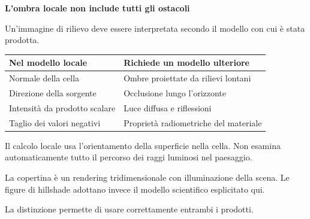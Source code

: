 \documentclass[12pt,aspectratio=1610]{beamer}
\newcommand{\PBody}[1]{\par{\fontsize{11.3}{14.8}\selectfont #1\par}}
\newcommand{\PSmall}[1]{\par{\fontsize{9.8}{13.1}\selectfont #1\par}}
\newcommand{\PInfo}[1]{%
\begin{tcolorbox}[enhanced,arc=1.6mm,boxrule=.55pt,colback=GeoTint,
 colframe=Rule!80!Classical,left=2.3mm,right=2.3mm,top=2mm,bottom=2mm,
 before skip=1mm,after skip=1mm]
\PSmall{#1}\end{tcolorbox}}
\begin{document}
\begin{frame}[plain]\hypertarget{slide72}{}
\begin{lrbox}{\TitleBox}
\begin{minipage}[t]{17.7cm}\raggedright\color{Ink}\fontsize{11.3}{14.8}\selectfont
\color{Navy}\bfseries\fontsize{20.6}{24.5}\selectfont L’ombra locale non include tutti gli ostacoli
\end{minipage}\end{lrbox}

\begin{lrbox}{\RecallBox}
\begin{minipage}[t]{14.3cm}\raggedright\color{Ink}\fontsize{11.3}{14.8}\selectfont
\fontsize{10.3}{13.8}\selectfont Un’immagine di rilievo deve essere interpretata secondo il modello con cui è stata prodotta.
\end{minipage}\end{lrbox}

\begin{lrbox}{\PilotLeftBox}
\begin{minipage}[t]{10.05cm}\raggedright\color{Ink}\fontsize{11.3}{14.8}\selectfont
{\fontsize{10.2}{13.1}\selectfont\renewcommand{\arraystretch}{1.45}\begin{tabular}{@{}p{4.4cm}p{4.6cm}@{}}\toprule
\textbf{Nel modello locale} & \textbf{Richiede un modello ulteriore}\\\midrule
Normale della cella & Ombre proiettate da rilievi lontani\\
Direzione della sorgente & Occlusione lungo l’orizzonte\\
Intensità da prodotto scalare & Luce diffusa e riflessioni\\
Taglio dei valori negativi & Proprietà radiometriche del materiale\\
\bottomrule\end{tabular}}

\end{minipage}\end{lrbox}

\begin{lrbox}{\PilotRightBox}
\begin{minipage}[t]{7.55cm}\raggedright\color{Ink}\fontsize{11.3}{14.8}\selectfont
\PBody{Il calcolo locale usa l’orientamento della superficie nella cella. Non esamina automaticamente tutto il percorso dei raggi luminosi nel paesaggio.}
\vspace{2.5mm}
\PInfo{La copertina è un rendering tridimensionale con illuminazione della scena. Le figure di hillshade adottano invece il modello scientifico esplicitato qui.}
\PBody{La distinzione permette di usare correttamente entrambi i prodotti.}
\vspace{2.5mm}


\end{minipage}
\end{lrbox}
\end{frame}
\end{document}
